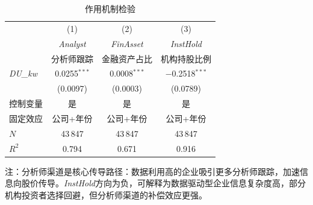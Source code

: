 \documentclass[11pt,a4paper]{article}
\begin{document}
\FloatBarrier

\begin{table}[htbp]
\centering
\caption{作用机制检验}
\label{tab:mechanism}
\small
\begin{tabular}{l*{3}{c}}
\toprule
 & (1) & (2) & (3) \\
 & \textit{Analyst} & \textit{FinAsset} & \textit{InstHold} \\
 & 分析师跟踪 & 金融资产占比 & 机构持股比例 \\
\midrule
\textit{DU\_kw}
 & 0.0255$^{***}$ & 0.0008$^{***}$ & $-$0.2518$^{***}$ \\
 & (0.0097) & (0.0003) & (0.0789) \\[6pt]
\midrule
控制变量 & 是 & 是 & 是 \\
固定效应 & 公司+年份 & 公司+年份 & 公司+年份 \\
$N$ & 43\,847 & 43\,847 & 43\,847 \\
$R^2$ & 0.794 & 0.671 & 0.916 \\
\bottomrule
\end{tabular}

\vspace{4pt}
{\footnotesize 注：分析师渠道是核心传导路径：数据利用高的企业吸引更多分析师跟踪，加速信息向股价传导。\textit{InstHold}方向为负，可解释为数据驱动型企业信息复杂度高，部分机构投资者选择回避，但分析师渠道的补偿效应更强。}
\end{table}


\FloatBarrier
\end{document}
